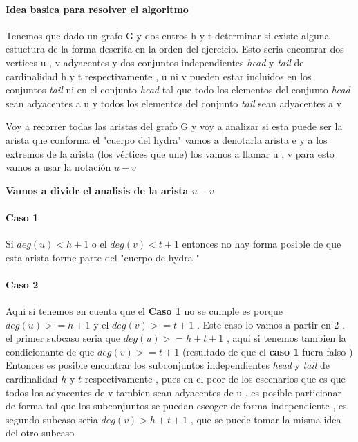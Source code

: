 \documentclass[12pt]{article}
\begin{document}
    
    \paragraph*{Idea basica para resolver el algoritmo } 
    Tenemos que dado un grafo G y dos entros h y t determinar si 
    existe alguna estuctura de la forma descrita en la orden del ejercicio. 
    Esto seria encontrar dos vertices u , v adyacentes y 
    dos conjuntos independientes \textit{head} y \textit{tail } 
    de cardinalidad h y t respectivamente , u ni v pueden estar 
    incluidos en los conjuntos \textit{tail} ni en el conjunto \textit{head} 
    tal que todo los elementos del conjunto \textit{head} sean 
    adyacentes a u y todos los  elementos del conjunto \textit{tail } sean adyacentes a v 

     

    \hspace*{0.5cm} 

    \begin{flushleft}
        Voy a recorrer todas las aristas del grafo G y voy a analizar si 
        esta puede ser la arista que conforma el "cuerpo del hydra"  vamos a 
        denotarla arista e y a los extremos de la arista (los v\'ertices que une) 
        los vamos a llamar u , v para esto vamos a usar la notaci\'on  $u - v$
    \end{flushleft}

    \textbf{Vamos a dividr el analisis de la arista $u-v$}

    \paragraph*{Caso 1 } Si $deg (u) <  h +1$   o el $deg(v) < t+1 $ entonces no hay forma posible 
    de que esta arista forme parte del "cuerpo de hydra "
    
    \paragraph*{Caso 2 } Aqui si tenemos en cuenta que el {\bf Caso 1} no se cumple es porque 
    $deg (u) >= h+1 $ y el $deg(v) >= t+1$  . Este caso lo vamos a partir en 2 . el primer subcaso seria que 
    $deg (u) >= h+t+1$ , aqui si tenemos tambien la condicionante de que $deg (v) >= t+1$ (resultado de que el {\bf caso 1} fuera falso  ) Entonces es posible 
    encontrar los subconjuntos independientes \textit{head}  y \textit{tail } de cardinalidad $h$ y $t$ respectivamente , pues en el peor de los escenarios  que es que 
    todos los adyacentes de v tambien sean adyacentes de u , es posible particionar de forma tal que los subconjuntos se puedan escoger de forma independiente , es segundo 
    subcaso seria $deg(v) > h+t+1$ , que se puede tomar la misma idea del otro subcaso 
\end{document}
